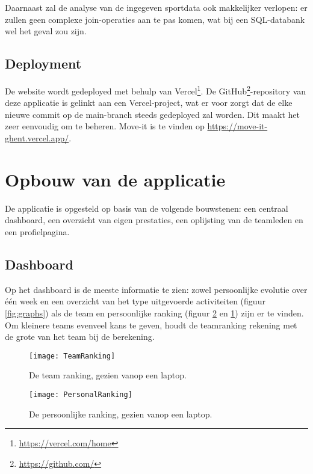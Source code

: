 Daarnaast zal de analyse van de ingegeven sportdata ook makkelijker verlopen: er zullen geen complexe join-operaties aan te pas komen, wat bij een SQL-databank wel het geval zou zijn.

\subsection{Deployment}

De website wordt gedeployed met behulp van Vercel\footnote{\href{https://vercel.com/home}{https://vercel.com/home}}. De GitHub\footnote{\href{https://github.com/}{https://github.com/}}-repository van deze applicatie is gelinkt aan een Vercel-project, wat er voor zorgt dat de elke nieuwe commit op de main-branch steeds gedeployed zal worden. Dit maakt het zeer eenvoudig om te beheren. Move-it is te vinden op \href{https://move-it-ghent.vercel.app/}{https://move-it-ghent.vercel.app/}.

\section{Opbouw van de applicatie}

De applicatie is opgesteld op basis van de volgende bouwstenen: een centraal dashboard, een overzicht van eigen prestaties, een oplijsting van de teamleden en een profielpagina.

\subsection{Dashboard}
Op het dashboard is de meeste informatie te zien: zowel persoonlijke evolutie over één week en een overzicht van het type uitgevoerde activiteiten (figuur \ref{fig:graphs}) als de team en persoonlijke ranking (figuur \ref{fig:personalRanking} en \ref{fig:teamRanking}) zijn er te vinden. Om kleinere teams evenveel kans te geven, houdt de teamranking rekening met de grote van het team bij de berekening.

\begin{figure}[h]
    \caption[Team ranking]{De team ranking, gezien vanop een laptop.}
    \texttt{[image: TeamRanking]}
    \label{fig:teamRanking}
\end{figure}

\begin{figure}[h]
    \caption[Persoonlijke ranking]{De persoonlijke ranking, gezien vanop een laptop.}
    \texttt{[image: PersonalRanking]}
    \label{fig:personalRanking}
\end{figure}

